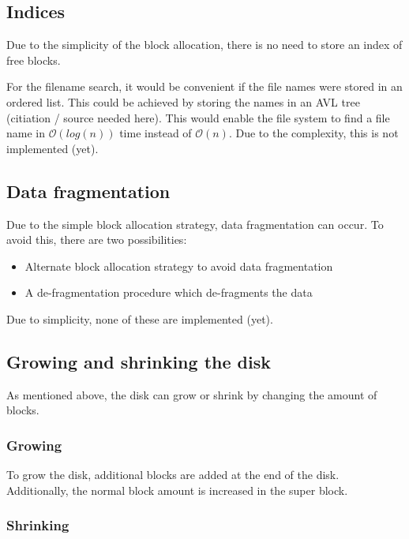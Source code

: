 \documentclass[JCDReport.tex]{subfiles}
\begin{document}
\subsection{Indices}

Due to the simplicity of the block allocation, there is no need to store an index of free blocks.

For the filename search, it would be convenient if the file names were stored in an ordered list. This could be achieved by storing the names in an AVL tree (citiation / source needed here). This would enable the file system to
find a file name in $\mathcal{O}(log(n))$ time instead of $\mathcal{O}(n)$. Due to the complexity, this is not implemented (yet).

\subsection{Data fragmentation}

Due to the simple block allocation strategy, data fragmentation can occur. To avoid this, there are two possibilities:

\begin{itemize}
  \item Alternate block allocation strategy to avoid data fragmentation
  \item A de-fragmentation procedure which de-fragments the data
\end{itemize}

Due to simplicity, none of these are implemented (yet).

\subsection{Growing and shrinking the disk}

As mentioned above, the disk can grow or shrink by changing the amount of blocks.

\subsubsection{Growing}

To grow the disk, additional blocks are added at the end of the disk. Additionally, the normal block amount is increased in the super block.

\subsubsection{Shrinking}
\end{document}
